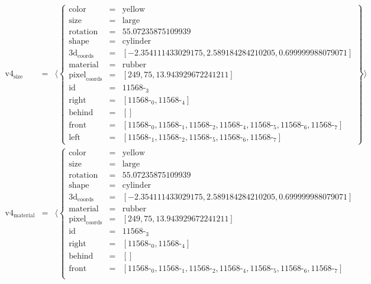 \documentclass{minimal}
\begin{document}
$$\begin{array}{rcl}
\text{v4}_{\text{size}} &=& \langle \left\{\begin{array}{rcl}
\text{color} &=& \text{yellow}\\
\text{size} &=& \text{large}\\
\text{rotation} &=& 55.07235875109939\\
\text{shape} &=& \text{cylinder}\\
\text{3d}_{\text{coords}} &=& [ -2.354111433029175, 2.589184284210205, 0.699999988079071]\\
\text{material} &=& \text{rubber}\\
\text{pixel}_{\text{coords}} &=& [ 249, 75, 13.943929672241211]\\
\text{id} &=& \text{11568-}_{\text{3}}\\
\text{right} &=& [ \text{11568-}_{\text{0}}, \text{11568-}_{\text{4}}]\\
\text{behind} &=& [ ]\\
\text{front} &=& [ \text{11568-}_{\text{0}}, \text{11568-}_{\text{1}}, \text{11568-}_{\text{2}}, \text{11568-}_{\text{4}}, \text{11568-}_{\text{5}}, \text{11568-}_{\text{6}}, \text{11568-}_{\text{7}}]\\
\text{left} &=& [ \text{11568-}_{\text{1}}, \text{11568-}_{\text{2}}, \text{11568-}_{\text{5}}, \text{11568-}_{\text{6}}, \text{11568-}_{\text{7}}]
\end{array}\right\}\rangle\\
\text{v4}_{\text{material}} &=& \langle \left\{\begin{array}{rcl}
\text{color} &=& \text{yellow}\\
\text{size} &=& \text{large}\\
\text{rotation} &=& 55.07235875109939\\
\text{shape} &=& \text{cylinder}\\
\text{3d}_{\text{coords}} &=& [ -2.354111433029175, 2.589184284210205, 0.699999988079071]\\
\text{material} &=& \text{rubber}\\
\text{pixel}_{\text{coords}} &=& [ 249, 75, 13.943929672241211]\\
\text{id} &=& \text{11568-}_{\text{3}}\\
\text{right} &=& [ \text{11568-}_{\text{0}}, \text{11568-}_{\text{4}}]\\
\text{behind} &=& [ ]\\
\text{front} &=& [ \text{11568-}_{\text{0}}, \text{11568-}_{\text{1}}, \text{11568-}_{\text{2}}, \text{11568-}_{\text{4}}, \text{11568-}_{\text{5}}, \text{11568-}_{\text{6}}, \text{11568-}_{\text{7}}]\\

\end{array}
\end{array}$$
\end{document}
